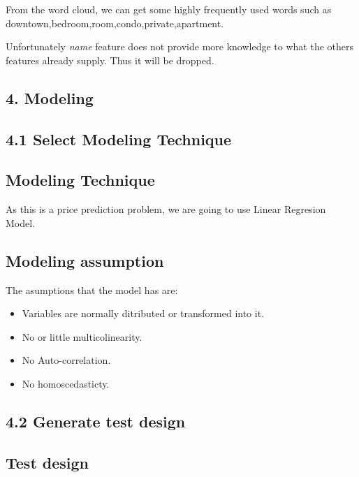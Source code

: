 From the word cloud, we can get some highly frequently used words such
as downtown,bedroom,room,condo,private,apartment.

Unfortunately \emph{name} feature does not provide more knowledge to
what the others features already supply. Thus it will be dropped.

\hypertarget{modeling}{%
\subsection{4. Modeling}\label{modeling}}

\hypertarget{select-modeling-technique}{%
\subsection{4.1 Select Modeling
Technique}\label{select-modeling-technique}}

\hypertarget{modeling-technique}{%
\subsection{Modeling Technique}\label{modeling-technique}}

As this is a price prediction problem, we are going to use Linear
Regresion Model.

\hypertarget{modeling-assumption}{%
\subsection{Modeling assumption}\label{modeling-assumption}}

The asumptions that the model has are:

\begin{itemize}
\tightlist
\item
  Variables are normally ditributed or transformed into it.
\item
  No or little multicolinearity.
\item
  No Auto-correlation.
\item
  No homoscedasticty.
\end{itemize}

\hypertarget{generate-test-design}{%
\subsection{4.2 Generate test design}\label{generate-test-design}}

\hypertarget{test-design}{%
\subsection{Test design}\label{test-design}}

